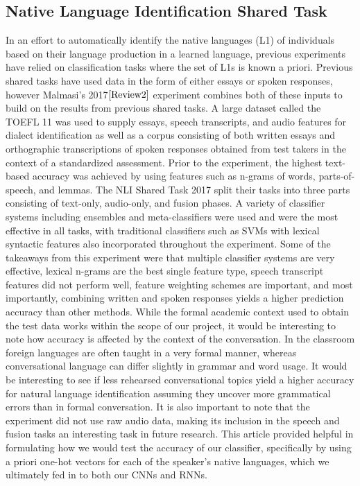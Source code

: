 \documentclass[12pt]{article}
\newcommand\tab[1][1cm]{\hspace*{#1}}
\begin{document}
\subsection{Native Language Identification Shared Task}
 \tab In an effort to automatically identify the native languages (L1) of individuals based on their language production in a learned language, previous experiments have relied on classification tasks where the set of L1s is known a priori. Previous shared tasks have used data in the form of either essays or spoken responses, however Malmasi's 2017$\cite{Review2}$ experiment combines both of these inputs to build on the results from previous shared tasks. A large dataset called the TOEFL 11 was used to supply essays, speech transcripts, and audio features for dialect identification as well as a corpus consisting of both written essays and orthographic transcriptions of spoken responses obtained from test takers in the context of a standardized assessment. Prior to the experiment, the highest text-based accuracy was achieved by using features such as n-grams of words, parts-of-speech, and lemmas. The NLI Shared Task 2017 split their tasks into three parts consisting of text-only, audio-only, and fusion phases. A variety of classifier systems including ensembles and meta-classifiers were used and were the most effective in all tasks, with traditional classifiers such as SVMs with lexical syntactic features also incorporated throughout the experiment. Some of the takeaways from this experiment were that multiple classifier systems are very effective, lexical n-grams are the best single feature type, speech transcript features did not perform well, feature weighting schemes are important, and most importantly, combining written and spoken responses yields a higher prediction accuracy than other methods. While the formal academic context used to obtain the test data works within the scope of our project, it would be interesting to note how accuracy is affected by the context of the conversation. In the classroom foreign languages are often taught in a very formal manner, whereas conversational language can differ slightly in grammar and word usage. It would be interesting to see if less rehearsed conversational topics yield a higher accuracy for natural language identification assuming they uncover more grammatical errors than in formal conversation. It is also important to note that the experiment did not use raw audio data, making its inclusion in the speech and fusion tasks an interesting task in future research. This article provided helpful in formulating how we would test the accuracy of our classifier, specifically by using a priori one-hot vectors for each of the speaker's native languages, which we ultimately fed in to both our CNNs and RNNs.
\end{document}
